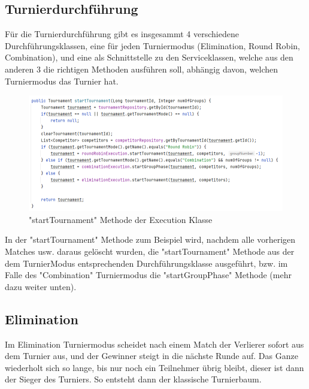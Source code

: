 \subsection{Turnierdurchführung}

Für die Turnierdurchführung gibt es insgesammt 4 verschiedene Durchführungsklassen, eine für jeden Turniermodus (Elimination, Round Robin, Combination), und eine als Schnittstelle zu den Serviceklassen, welche aus den anderen 3 
die richtigen Methoden ausführen soll, abhängig davon, welchen Turniermodus das Turnier hat. 

\begin{figure}[H]
    \includegraphics[scale=0.65]{pics/execution_startTournament.png}
    \caption{"startTournament" Methode der Execution Klasse}
\end{figure}

In der "startTournament" Methode zum Beispiel wird, nachdem alle vorherigen Matches usw. daraus gelöscht wurden, die "startTournament" Methode aus der dem TurnierModus entsprechenden Durchführungsklasse ausgeführt, 
bzw. im Falle des "Combination" Turniermodus die "startGroupPhase" Methode (mehr dazu weiter unten).

\subsection{Elimination}

Im Elimination Turniermodus scheidet nach einem Match der Verlierer sofort aus dem Turnier aus, und der Gewinner steigt in die nächste Runde auf. 
Das Ganze wiederholt sich so lange, bis nur noch ein Teilnehmer übrig bleibt, dieser ist dann der Sieger des Turniers. So entsteht dann der klassische Turnierbaum.

